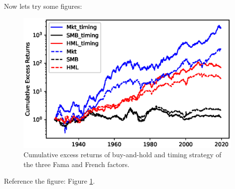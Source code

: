 \documentclass[a4paper,12pt]{article}
\begin{document}
	Now lets try some figures:
		\begin{figure}[H]
			\centering
			\includegraphics[width=\textwidth]{img/Replication.eps}
			\caption{Cumulative excess returns of buy-and-hold and timing strategy of the three Fama and French factors.}
            \label{fig:replication}
	\end{figure}
	Reference the figure: Figure \ref{fig:replication}. \cite{Busse}
	


	\clearpage\thispagestyle{empty}\addtocounter{page}{-1}\mbox{}
	
	\printbibliography[heading=bibintoc]
	
	
\end{document}
